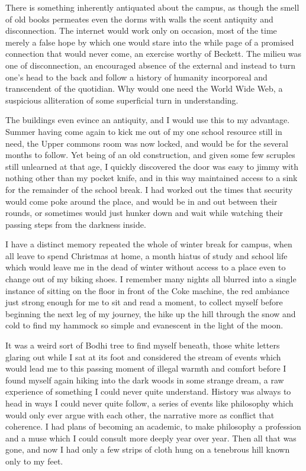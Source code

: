 \documentclass[ebook, 10pt, openright, onecolumn]{memoir}
\begin{document}
There is something inherently antiquated about the campus, as though the smell
of old books permeates even the dorms with walls the scent antiquity and
disconnection.  The internet would work only on occasion, most of the time
merely a false hope by which one would stare into the while page of a promised
connection that would never come, an exercise worthy of Beckett.  The
milieu was one of disconnection, an encouraged absence of the external and
instead to turn one's head to the back and follow a history of humanity
incorporeal and transcendent of the quotidian.  Why would one need the World
Wide Web, a suspicious alliteration of some superficial turn in understanding.

The buildings even evince an antiquity, and I would use this to my
advantage. Summer having come again to kick me out of my one school resource
still in need, the Upper commons room was now locked, and would be for the
several months to follow.  Yet being of an old construction, and given some few
scruples still unlearned at that age, I quickly discovered the door was easy to
jimmy with nothing other than my pocket knife, and in this way maintained access
to a sink for the remainder of the school break.  I had worked out the times
that security would come poke around the place, and would be in and out between
their rounds, or sometimes would just hunker down and wait while watching their
passing steps from the darkness inside.  

I have a distinct memory repeated the whole of winter break for campus, when all
leave to spend Christmas at home, a month hiatus of study and school life which
would leave me in the dead of winter without access to a place even to change
out of my biking shoes.  I remember many nights all blurred into a single
instance of sitting on the floor in front of the Coke machine, the red ambiance
just strong enough for me to sit and read a moment, to collect myself before
beginning the next leg of my journey, the hike up the hill through the snow and
cold to find my hammock so simple and evanescent in the light of the moon.

It was a weird sort of Bodhi tree to find myself beneath, those white letters
glaring out while I sat at its foot and considered the stream of events which
would lead me to this passing moment of illegal warmth and comfort before I
found myself again hiking into the dark woods in some strange dream, a raw
experience of something I could never quite understand.  History was always to
head in ways I could never quite follow, a series of events like philosophy
which would only ever argue with each other, the narrative more as conflict that
coherence.  I had plans of becoming an academic, to make philosophy a profession
and a muse which I could consult more deeply year over year.  Then all that was
gone, and now I had only a few strips of cloth hung on a tenebrous hill known
only to my feet.
\end{document}
